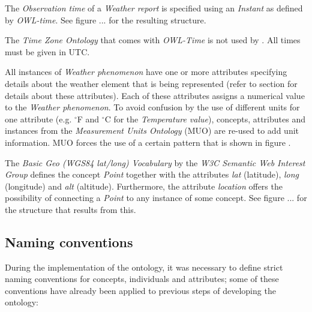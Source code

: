 
The \emph{Observation time} of a \emph{Weather report} is specified using an \emph{Instant} as defined by \emph{OWL-time}. See figure ... for the resulting structure. %


The \emph{Time Zone Ontology} that comes with \emph{OWL-Time} is not used by \thinkhomeweather. All times must be given in UTC.

All instances of \emph{Weather phenomenon} have one or more attributes specifying details about the weather element that is being represented (refer to section \label{subsec:instance_attribute_tables} for details about these attributes). Each of these attributes assigns a numerical value to the \emph{Weather phenomenon}. To avoid confusion by the use of different units for one attribute (e.g. $^\circ$F and $^\circ$C for the \emph{Temperature value}), concepts, attributes and instances from the \emph{Measurement Units Ontology} (MUO) are re-used to add unit information. MUO forces the use of a certain pattern that is shown in figure . %

The \emph{Basic Geo (WGS84 lat/long) Vocabulary} by the \emph{W3C Semantic Web Interest Group} defines the concept \emph{Point} together with the attributes \emph{lat} (latitude), \emph{long} (longitude) and \emph{alt} (altitude). Furthermore, the attribute \emph{location} offers the possibility of connecting a \emph{Point} to any instance of some concept. See figure ... for the structure that results from this. %


\subsection{Naming conventions}

During the implementation of the \thinkhomeweather ontology, it was necessary to define strict naming conventions for concepts, individuals and attributes; some of these conventions have already been applied to previous steps of developing the ontology:

